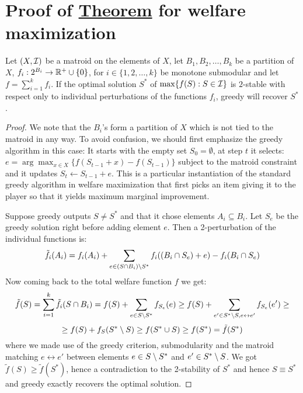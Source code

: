 \section{Proof of \hyperref[th:submod]{Theorem} for welfare maximization}\label{app:submod}

\begin{theorem}
Let $(X,\mathcal{I})$ be a matroid on the elements of $X$, let $B_1,B_2,\dots,B_k$ be a partition of $X$, $f_i: 2^{B_i}\to \mathbb{R}^+\cup\{0\}$, for $i\in \{1,2,\dots,k\}$ be monotone submodular and let $f=\sum_{i=1}^kf_i$. If the optimal solution $S^*$ of $\max\{f(S): S\in \mathcal{I}\}$ is $2$-stable with respect only to individual perturbations of the functions $f_i$, greedy will recover $S^*$.
\end{theorem}

\begin{proof}
We note that the $B_i$'s form a partition of $X$ which is not tied to the matroid in any way. To avoid confusion, we should first emphasize the greedy algorithm in this case: It starts with the empty set $S_0=\emptyset$, at step $t$ it selects: $e=\arg\max_{x\in X}\{f(S_{t-1}+x)-f(S_{t-1})\}$ subject to the matroid constraint and it updates $S_t\leftarrow S_{t-1}+e$. This is a particular instantiation of the standard greedy algorithm in welfare maximization that first picks an item giving it to the player so that it yields maximum marginal improvement.

Suppose greedy outputs $S\neq S^*$ and that it chose elements $A_i\subseteq B_i$. Let $S_e$ be the greedy solution right before adding element $e$. Then a 2-perturbation of the individual functions is:
\[
\tilde{f_i}(A_i)=f_i(A_i)+\sum_{e\in (S\cap B_i)\setminus S^*}f_i((B_i\cap S_e)+e)-f_i(B_i\cap S_e)
\]
Now coming back to the total welfare function $f$ we get:
\[
\tilde{f}(S)=\sum_{i=1}^k\tilde{f}_i(S\cap B_i)=f(S)+\sum_{e\in S\setminus S^*}f_{S_e}(e)\ge f(S)+\sum_{e'\in S^*\setminus S, e\leftrightarrow e'}f_{S_e}(e')\ge
\]
\[
\ge f(S)+f_S(S^*\setminus S)\ge f(S^*\cup S)\ge f(S^*)=\tilde{f}(S^*)
\]
where we made use of the greedy criterion, submodularity and the matroid matching $e\leftrightarrow e'$ between elements $e\in S\setminus S^*$ and $e' \in S^*\setminus S$. We got $\tilde{f}(S)\ge \tilde{f}(S^*)$, hence a contradiction to the 2-stability of $S^*$ and hence $S\equiv S^*$ and greedy exactly recovers the optimal solution. 
\end{proof}

























